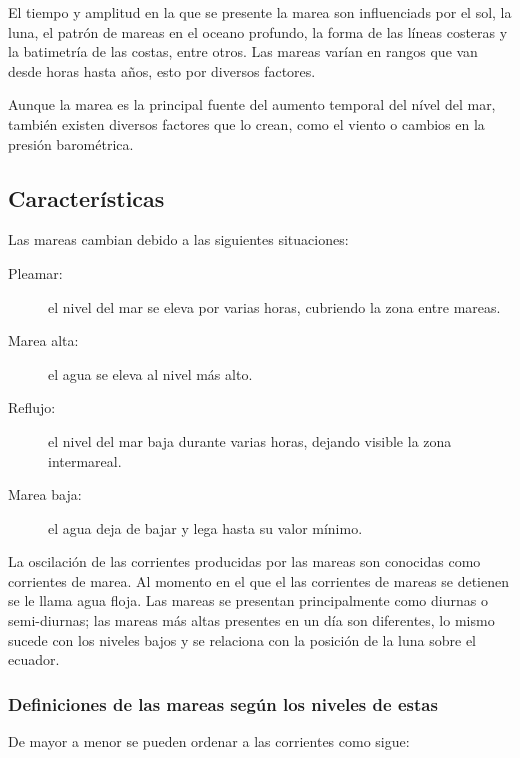 El tiempo y amplitud en la que se presente la marea son influenciads por el sol, la luna,  el patrón de mareas en el oceano profundo, la forma de las líneas costeras y la batimetría de las costas, entre otros. Las mareas varían en rangos que van desde horas hasta años, esto por diversos factores. 

Aunque la marea es la principal fuente del aumento temporal del nível del mar, también existen diversos factores que lo crean, como el viento o cambios en la presión barométrica.

\subsection{Características}
Las mareas cambian debido a las siguientes situaciones:

\begin{description}
\item[Pleamar:] el nivel del mar se eleva por varias horas, cubriendo la zona entre mareas.
\item[Marea alta:] el agua se eleva al nivel más alto.
\item[Reflujo:] el nivel del mar baja durante varias horas, dejando visible la zona intermareal.
\item[Marea baja:] el agua deja de bajar y lega hasta su valor mínimo.
\end{description}

La oscilación de las corrientes producidas por las mareas son conocidas como corrientes de marea. Al momento en el que el las corrientes de mareas se detienen se le llama agua floja. Las mareas se presentan principalmente como diurnas o semi-diurnas; las mareas más altas presentes en un día son diferentes, lo mismo sucede con los niveles bajos y se relaciona con la posición de la luna sobre el ecuador.

\subsubsection{Definiciones de las mareas según los niveles de estas}

De mayor a menor se pueden ordenar a las corrientes como sigue:


